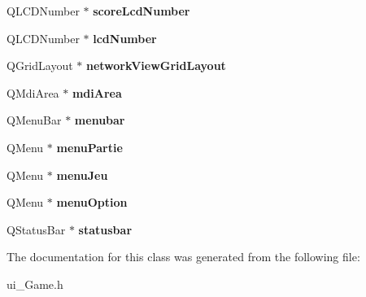 \begin{DoxyCompactItemize}
\item 
\hypertarget{class_ui___game_ae3ff9abfdab2f8c1305564cc55fef95a}{Q\-L\-C\-D\-Number $\ast$ {\bfseries score\-Lcd\-Number}}\label{class_ui___game_ae3ff9abfdab2f8c1305564cc55fef95a}

\item 
\hypertarget{class_ui___game_ad67c35ced5afee47d930dd2efaf1f7f6}{Q\-L\-C\-D\-Number $\ast$ {\bfseries lcd\-Number}}\label{class_ui___game_ad67c35ced5afee47d930dd2efaf1f7f6}

\item 
\hypertarget{class_ui___game_a791366e567865be7583191a4f510a322}{Q\-Grid\-Layout $\ast$ {\bfseries network\-View\-Grid\-Layout}}\label{class_ui___game_a791366e567865be7583191a4f510a322}

\item 
\hypertarget{class_ui___game_a9d65897811a589cb95a2a07b6b8a2145}{Q\-Mdi\-Area $\ast$ {\bfseries mdi\-Area}}\label{class_ui___game_a9d65897811a589cb95a2a07b6b8a2145}

\item 
\hypertarget{class_ui___game_ac529b369ede9a7ac29681dbb58589451}{Q\-Menu\-Bar $\ast$ {\bfseries menubar}}\label{class_ui___game_ac529b369ede9a7ac29681dbb58589451}

\item 
\hypertarget{class_ui___game_a5495e6958dfc863980290ed3722b8b9c}{Q\-Menu $\ast$ {\bfseries menu\-Partie}}\label{class_ui___game_a5495e6958dfc863980290ed3722b8b9c}

\item 
\hypertarget{class_ui___game_abba2b72c81c5a6c7c85de0f21affef0b}{Q\-Menu $\ast$ {\bfseries menu\-Jeu}}\label{class_ui___game_abba2b72c81c5a6c7c85de0f21affef0b}

\item 
\hypertarget{class_ui___game_acb2800cbe443023738b2a8d1674ee80e}{Q\-Menu $\ast$ {\bfseries menu\-Option}}\label{class_ui___game_acb2800cbe443023738b2a8d1674ee80e}

\item 
\hypertarget{class_ui___game_ab66c5b8158058f71656936c76a61c485}{Q\-Status\-Bar $\ast$ {\bfseries statusbar}}\label{class_ui___game_ab66c5b8158058f71656936c76a61c485}

\end{DoxyCompactItemize}


The documentation for this class was generated from the following file\-:\begin{DoxyCompactItemize}
\item 
ui\-\_\-\-Game.\-h\end{DoxyCompactItemize}
